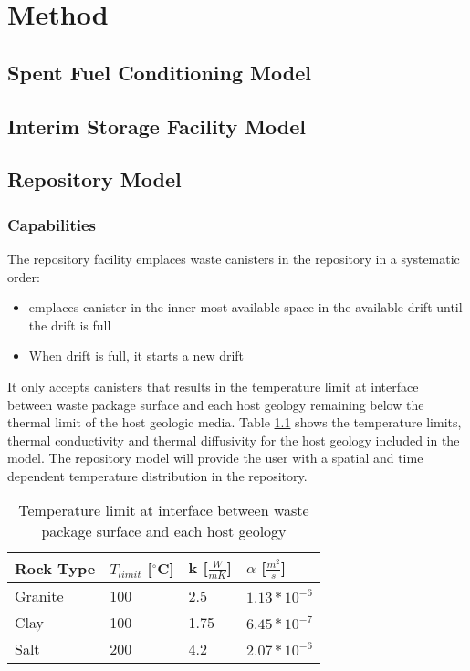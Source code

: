 \chapter{Method}

\section{Spent Fuel Conditioning Model}

\section{Interim Storage Facility Model}

\section{Repository Model}

\subsection{Capabilities}
The repository facility emplaces waste canisters in the repository 
in a systematic order: 
\begin{itemize}
    \item emplaces canister in the inner most available space 
    in the available drift until the drift is full 
    \item When drift is full, it starts a new drift
\end{itemize}
It only accepts canisters that results in the temperature limit at
interface between waste package surface and each host geology 
remaining below the thermal limit of the host geologic media. 
Table \ref{tab:temp_limit} shows the temperature limits, thermal 
conductivity and thermal diffusivity for the host geology included 
in the model. 
The repository model will provide the user with a spatial and time 
dependent temperature distribution in the repository. 

\begin{table}[h]
    \centering
	\label{tab:temp_limit}
    \caption{Temperature limit at interface between waste package 
    surface and each host geology \cite{sutton_investigations_2011}}
	\begin{tabular}{|l|l|l|l|}
	\hline
	Rock Type & $T_{limit}$ [$^\circ$C] & k [$\frac{W}{mK}$] &  $\alpha$ [$\frac{m^2}{s}$]  \\ \hline
	Granite   & 100 & 2.5  & $1.13*10^{-6}$\\ \hline
	Clay      & 100 & 1.75 & $6.45*10^{-7}$\\ \hline
	Salt      & 200 & 4.2  & $2.07*10^{-6}$\\ \hline
	\end{tabular}
\end{table}

